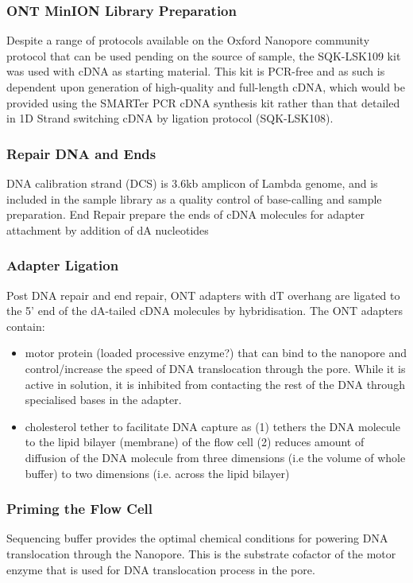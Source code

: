 \subsubsection{ONT MinION Library Preparation}
Despite a range of protocols available on the Oxford Nanopore community protocol that can be used pending on the source of sample, the SQK-LSK109 kit was used with cDNA as starting material. This kit is PCR-free and as such is dependent upon generation of high-quality and full-length cDNA, which would be provided using the SMARTer PCR cDNA synthesis kit rather than that detailed in 1D Strand switching cDNA by ligation protocol (SQK-LSK108).

\subsubsection{Repair DNA and Ends}
DNA calibration strand (DCS) is 3.6kb amplicon of Lambda genome, and is included in the sample library as a quality control of base-calling and sample preparation. End Repair prepare the ends of cDNA molecules for adapter attachment by addition of dA nucleotides

\subsubsection{Adapter Ligation}
Post DNA repair and end repair, ONT adapters with dT overhang are ligated to the 5’ end of the dA-tailed cDNA molecules by hybridisation. The ONT adapters contain: 
\begin{itemize}
	\item motor protein (loaded processive enzyme?) that can bind to the nanopore and control/increase the speed of DNA translocation through the pore. While it is active in solution, it is inhibited from contacting the rest of the DNA through specialised bases in the adapter.
	\item cholesterol tether to facilitate DNA capture as (1) tethers the DNA molecule to the lipid bilayer (membrane) of the flow cell  (2) reduces amount of diffusion of the DNA molecule from three dimensions (i.e the volume of whole buffer) to two dimensions (i.e. across the lipid bilayer)  
\end{itemize}

\subsubsection{Priming the Flow Cell}
Sequencing buffer provides the optimal chemical conditions for powering DNA translocation through the Nanopore. This is the substrate cofactor of the motor enzyme that is used for DNA translocation process in the pore. 

